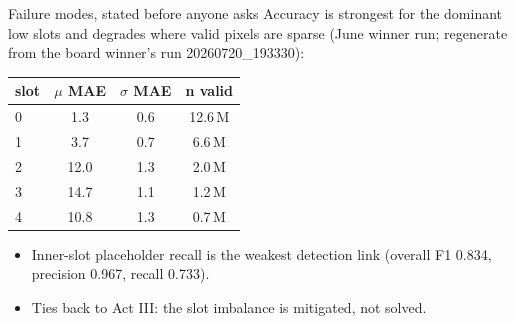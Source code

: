 \begin{frame}{Failure modes, stated before anyone asks}
  \small
  Accuracy is strongest for the dominant low slots and degrades where valid pixels are
  sparse (June winner run; regenerate from the board winner's run 20260720\_193330):
  \begin{center}
  \begin{tabular}{@{}lccc@{}}
    \toprule
    slot & $\mu$ MAE & $\sigma$ MAE & n valid \\
    \midrule
    0 & 1.3  & 0.6 & 12.6\,M \\
    1 & 3.7  & 0.7 & 6.6\,M \\
    2 & 12.0 & 1.3 & 2.0\,M \\
    3 & 14.7 & 1.1 & 1.2\,M \\
    4 & 10.8 & 1.3 & 0.7\,M \\
    \bottomrule
  \end{tabular}
  \end{center}
  \begin{itemize}
    \item Inner-slot placeholder recall is the weakest detection link
          (overall F1 0.834, precision 0.967, recall 0.733).
    \item Ties back to Act III: the slot imbalance is mitigated, not solved.
  \end{itemize}
\end{frame}
